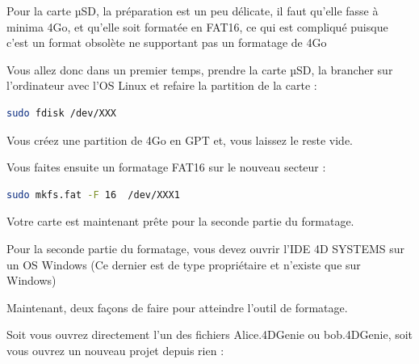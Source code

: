 \documentclass[11pt]{article}
\begin{document}
Pour la carte µSD, la préparation est un peu délicate, il faut qu'elle fasse à minima 4Go, et qu'elle soit formatée en FAT16, ce qui est compliqué puisque c'est un format obsolète ne supportant pas un formatage de 4Go

Vous allez donc dans un premier temps, prendre la carte µSD, la brancher sur l'ordinateur avec l'OS Linux et refaire la partition de la carte :

\begin{lstlisting}[language=bash]
	sudo fdisk /dev/XXX
\end{lstlisting}

Vous créez une partition de 4Go en GPT et, vous laissez le reste vide.

Vous faites ensuite un formatage FAT16 sur le nouveau secteur :

\begin{lstlisting}[language=bash]
	sudo mkfs.fat -F 16  /dev/XXX1
\end{lstlisting}

Votre carte est maintenant prête pour la seconde partie du formatage.

Pour la seconde partie du formatage, vous devez ouvrir l'IDE 4D SYSTEMS sur un OS Windows (Ce dernier est de type propriétaire et n'existe que sur Windows)

\newpage 
Maintenant, deux façons de faire pour atteindre l'outil de formatage.

Soit vous ouvrez directement l'un des fichiers Alice.4DGenie ou bob.4DGenie, soit vous ouvrez un nouveau projet depuis rien :
\\
\end{document}
